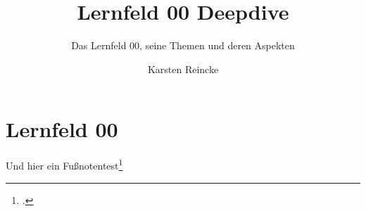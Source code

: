 \documentclass[
  DIV=calc,
  BCOR=5mm,
  11pt,
  headings=small,
  oneside,
  abstract=true,
  toc=bib,
  english,ngerman]{scrartcl}
\def\bibGl{../../bib.gl}
\def\cfgGl{../../cfg.gl/}
\def\cfgLf{../cfg.lf}
\begin{document}

\nocite{*}

\titlehead{Ausbildung zur Fachinformatikerin}
\subject{Release }
\title{Lernfeld 00 Deepdive}

\subtitle{Das Lernfeld 00, seine Themen und deren Aspekten}
\author{Karsten Reincke}

\maketitle

\section{Lernfeld 00}





Und hier ein Fußnotentest\footcite[vgl.][17]{RlpIt2019a}



\printbibliography


\printnomenclature
\end{document}
